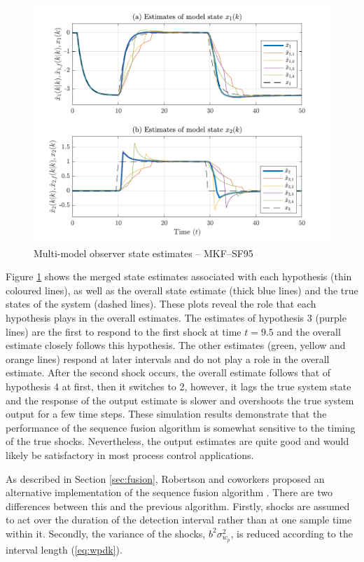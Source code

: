 \begin{figure}[htp]
	\centering
	\includegraphics[width=13cm]{images/rod_MKF_test_sim_MKF_SF95_x_est.pdf}
	\caption{Multi-model observer state estimates – MKF--SF95}
	\label{fig:rod-obs-sim-test-x_est-SF95}
\end{figure}
Figure \ref{fig:rod-obs-sim-test-x_est-SF95} shows the merged state estimates associated with each hypothesis (thin coloured lines), as well as the overall state estimate (thick blue lines) and the true states of the system (dashed lines). These plots reveal the role that each hypothesis plays in the overall estimates. The estimates of hypothesis 3 (purple lines) are the first to respond to the first shock at time $t=9.5$ and the overall estimate closely follows this hypothesis. The other estimates (green, yellow and orange lines) respond at later intervals and do not play a role in the overall estimate. After the second shock occurs, the overall estimate follows that of hypothesis 4 at first, then it switches to 2, however, it lags the true system state and the response of the output estimate is slower and overshoots the true system output for a few time steps. These simulation results demonstrate that the performance of the sequence fusion algorithm is somewhat sensitive to the timing of the true shocks. Nevertheless, the output estimates are quite good and would likely be satisfactory in most process control applications. 

As described in Section \ref{sec:fusion}, Robertson and coworkers proposed an alternative implementation of the sequence fusion algorithm \citep{robertson_method_1998}. There are two differences between this and the previous algorithm. Firstly, shocks are assumed to act over the duration of the detection interval rather than at one sample time within it. Secondly, the variance of the shocks, $b^2\sigma_{w_p}^2$, is reduced according to the interval length (\ref{eq:wpdk}).

